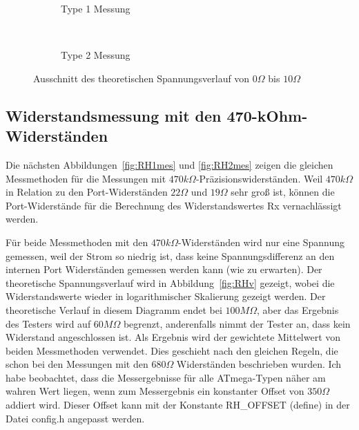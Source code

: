 \begin{figure}[H]
  \begin{subfigure}[b]{9cm}
    \centering
    \resizebox{9cm}{!}{}
    \caption{Type 1 Messung}
    \label{fig:RLvlow}
  \end{subfigure}
  ~
  \begin{subfigure}[b]{9cm}
    \centering
    \resizebox{9cm}{!}{}
    \caption{Type 2 Messung}
    \label{fig:RLvhigh}
  \end{subfigure}
  \caption{Ausschnitt des theoretischen Spannungsverlauf von \(0\Omega\) bis \(10\Omega\)}
\end{figure}


\subsection{Widerstandsmessung mit den 470-kOhm-Widerständen}
Die nächsten Abbildungen~\ref{fig:RH1mes} und \ref{fig:RH2mes} zeigen die gleichen Messmethoden für die Messungen mit
 \(470k\Omega\)-Präzisionswiderständen.
Weil \(470k\Omega\) in Relation zu den Port-Widerständen \(22\Omega\) und \(19\Omega\) sehr groß ist,
können die Port-Widerstände für die Berechnung des Widerstandswertes Rx vernachlässigt werden.

Für beide Messmethoden mit den \(470k\Omega\)-Widerständen wird nur eine Spannung gemessen, weil der Strom
so niedrig ist, dass keine Spannungsdifferenz an den internen Port Widerständen gemessen werden kann (wie zu erwarten).
Der theoretische Spannungsverlauf wird in Abbildung~\ref{fig:RHv} gezeigt, wobei die Widerstandswerte wieder in
logarithmischer Skalierung gezeigt werden.
Der theoretische Verlauf in diesem Diagramm endet bei \(100M\Omega\), aber das Ergebnis des Testers wird auf
 \(60M\Omega\) begrenzt, anderenfalls nimmt der Tester an, dass kein Widerstand angeschlossen ist.
Als Ergebnis wird der gewichtete Mittelwert von beiden Messmethoden verwendet. Dies geschieht nach den gleichen Regeln, die schon bei
den Messungen mit den  \(680\Omega\) Widerständen beschrieben wurden.
Ich habe beobachtet, dass die Messergebnisse für alle ATmega-Typen  näher am wahren Wert liegen, wenn zum Messergebnis
ein konstanter Offset von \(350\Omega\) addiert wird.
Dieser Offset kann mit der Konstante RH\_OFFSET (define) in der Datei config.h angepasst werden.

